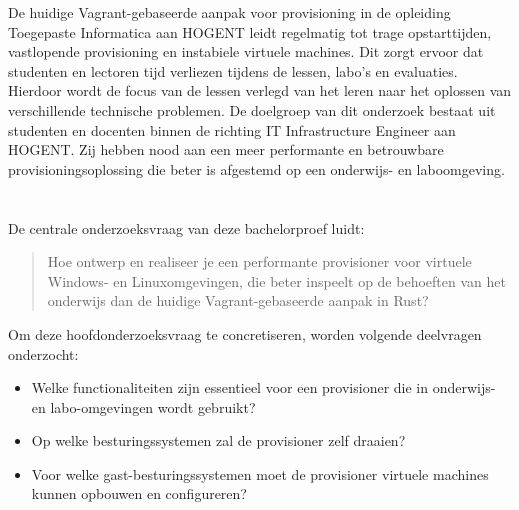 
De huidige Vagrant-gebaseerde aanpak voor provisioning in de opleiding Toegepaste Informatica aan HOGENT leidt regelmatig tot trage opstarttijden, vastlopende provisioning en instabiele virtuele machines. Dit zorgt ervoor dat studenten en lectoren tijd verliezen tijdens de lessen, labo's en evaluaties. Hierdoor wordt de focus van de lessen verlegd van het leren naar het oplossen van verschillende technische problemen. De doelgroep van dit onderzoek bestaat uit studenten en docenten binnen de richting IT Infrastructure Engineer aan HOGENT. Zij hebben nood aan een meer performante en betrouwbare provisioningsoplossing die beter is afgestemd op een onderwijs- en laboomgeving.

\section{}%
\label{sec:onderzoeksvraag}


De centrale onderzoeksvraag van deze bachelorproef luidt:
\begin{quote}
    Hoe ontwerp en realiseer je een performante provisioner voor virtuele Windows- en Linuxomgevingen, die beter inspeelt op de behoeften van het onderwijs dan de huidige Vagrant-gebaseerde aanpak in Rust?
\end{quote}

Om deze hoofdonderzoeksvraag te concretiseren, worden volgende deelvragen onderzocht:
\begin{itemize}
    \item Welke functionaliteiten zijn essentieel voor een provisioner die in onderwijs- en labo-omgevingen wordt gebruikt?
    \item Op welke besturingssystemen zal de provisioner zelf draaien?
    \item Voor welke gast-besturingssystemen moet de provisioner virtuele machines kunnen opbouwen en configureren?
\end{itemize}


